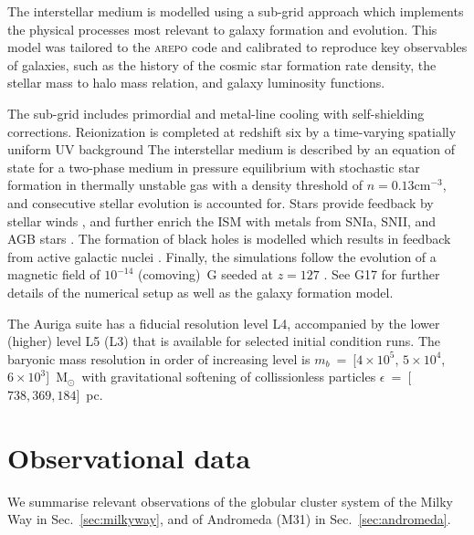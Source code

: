 \documentclass[a4paper,fleqn,usenatbib]{mnras}
\newcommand{\Sun}[0]{\ensuremath{_{\odot}}}
\begin{document}
The interstellar medium is modelled using a sub-grid approach which implements
the physical processes most relevant to galaxy formation and evolution.
This model was tailored to the \textsc{arepo} code and calibrated to reproduce
key observables of galaxies, such as the history of the cosmic star formation rate
density, the stellar mass to halo mass relation, and galaxy luminosity functions.

The sub-grid includes primordial and metal-line cooling with self-shielding
corrections. Reionization is completed at redshift six by a time-varying
spatially uniform UV background \citep{2009ApJ...703.1416F, 2013MNRAS.436.3031V}
The interstellar medium is described by an equation of state for a two-phase medium
in pressure equilibrium \citep{2003MNRAS.339..289S} with stochastic star formation
in thermally unstable gas with a density threshold of $n = 0.13 \text{cm}^{-3}$,
and consecutive stellar evolution is accounted for. Stars provide feedback by
stellar winds \citep{2014MNRAS.437.1750M, 2017MNRAS.467..179G}, and further
enrich the ISM with metals from SNIa, SNII, and AGB stars \citep{2013MNRAS.436.3031V}.
The formation of black holes is modelled which results in feedback from active
galactic nuclei \citep{2005MNRAS.361..776S, 2014MNRAS.437.1750M, 2017MNRAS.467..179G}.
Finally, the simulations follow the evolution of a magnetic field of $10^{-14}$
(comoving)~G seeded at $z = 127$ \citep{2013MNRAS.432..176P, 2014ApJ...783L..20P}.
See G17 for further details of the numerical setup as well as the galaxy formation
model.

The Auriga suite has a fiducial resolution level L4, accompanied by the lower
(higher) level L5 (L3) that is available for selected initial condition runs.
The baryonic mass resolution in order of increasing level is $m_b$~=~[$4 \times 10^5$,
$5 \times 10^4$, $6 \times 10^3$]~M\Sun \, with gravitational softening of
collissionless particles $\epsilon$~=~[$738, 369, 184$]~pc.


%


\section{Observational data}
\label{sec:observations}
We summarise relevant observations of the globular cluster system of the Milky
Way in Sec.~\ref{sec:milkyway}, and of Andromeda (M31) in Sec.~\ref{sec:andromeda}.
\end{document}
